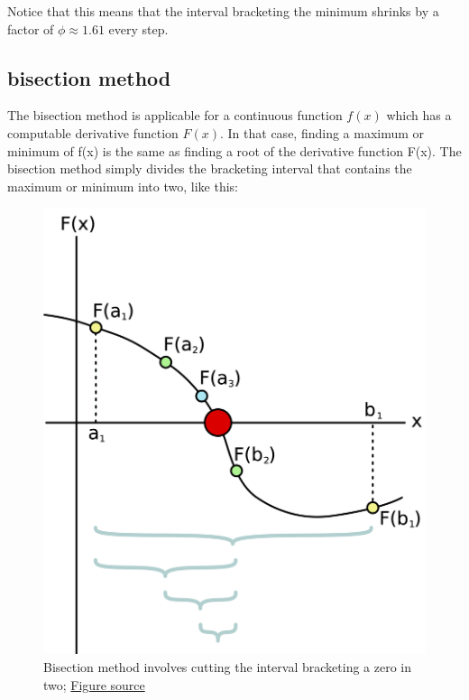 \documentclass[
  letterpaper,
  DIV=11,
  numbers=noendperiod]{scrreprt}
\begin{document}
Notice that this means that the interval bracketing the minimum shrinks
by a factor of \(\phi \approx 1.61\) every step.

\subsection{bisection method}\label{bisection-method}

The bisection method is applicable for a continuous function \(f(x)\)
which has a computable derivative function \(F(x)\). In that case,
finding a maximum or minimum of f(x) is the same as finding a root of
the derivative function F(x). The bisection method simply divides the
bracketing interval that contains the maximum or minimum into two, like
this:

\begin{figure}[H]

{\centering \includegraphics{figs/Bisection_method.png}

}

\caption{Bisection method involves cutting the interval bracketing a
zero in two;
\href{https://en.wikipedia.org/wiki/Bisection_method\#/media/File:Bisection_method.svg}{Figure
source}}

\end{figure}%
\end{document}
